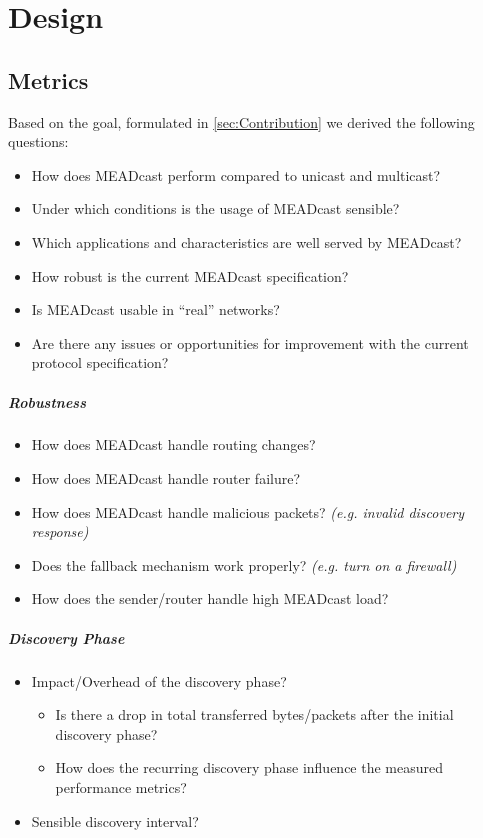 \chapter{Design} %
\label{chap:Design}

\section{Metrics} %
\label{sec:Metrics}
Based on the goal, formulated in \autoref{sec:Contribution} we derived the
    following questions:

\begin{itemize}
    \item How does MEADcast perform compared to unicast and multicast?
    \item Under which conditions is the usage of MEADcast sensible?
    \item Which applications and characteristics are well served by MEADcast?
    \item How robust is the current MEADcast specification?
    \item Is MEADcast usable in ``real'' networks?
    \item Are there any issues or opportunities for improvement with the
        current protocol specification?
\end{itemize}

\paragraph{Robustness} %
\label{par:Robustness}
\begin{itemize}
    \item How does MEADcast handle routing changes?
    \item How does MEADcast handle router failure?
    \item How does MEADcast handle malicious packets?
        \textit{(e.g. invalid discovery response)}
    \item Does the fallback mechanism work properly?
        \textit{(e.g. turn on a firewall)}
    \item How does the sender/router handle high MEADcast load?
\end{itemize}

\paragraph{Discovery Phase} %
\label{par:Discovery Phase}
\begin{itemize}
    \item Impact/Overhead of the discovery phase?
    \begin{itemize}
        \item Is there a drop in total transferred bytes/packets after the
            initial discovery phase?
        \item How does the recurring discovery phase influence the measured
            performance metrics?
    \end{itemize}
    \item Sensible discovery interval?
\end{itemize}

